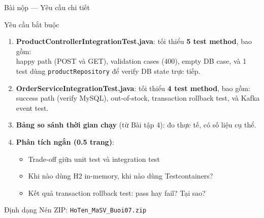 \documentclass[aspectratio=169,10pt]{beamer}
\begin{document}
\begin{frame}{Bài nộp --- Yêu cầu chi tiết}
  \begin{block}{Yêu cầu bắt buộc}
    \begin{enumerate}
      \item \textbf{ProductControllerIntegrationTest.java}:
        tối thiểu \textbf{5 test method}, bao gồm:\\
        happy path (POST và GET), validation cases (400),
        empty DB case, và 1 test dùng \texttt{productRepository}
        để verify DB state trực tiếp.

      \item \textbf{OrderServiceIntegrationTest.java}:
        tối thiểu \textbf{4 test method}, bao gồm:\\
        success path (verify MySQL), out-of-stock,
        transaction rollback test, và Kafka event test.

      \item \textbf{Bảng so sánh thời gian chạy} (từ Bài tập 4):
        đo thực tế, có số liệu cụ thể.

      \item \textbf{Phân tích ngắn (0.5 trang)}:
        \begin{itemize}
          \item Trade-off giữa unit test và integration test
          \item Khi nào dùng H2 in-memory, khi nào dùng Testcontainers?
          \item Kết quả transaction rollback test: pass hay fail? Tại sao?
        \end{itemize}
    \end{enumerate}
  \end{block}

  \begin{alertblock}{Định dạng}
    Nén ZIP: \texttt{HoTen\_MaSV\_Buoi07.zip}
  \end{alertblock}
\end{frame}
\end{document}
